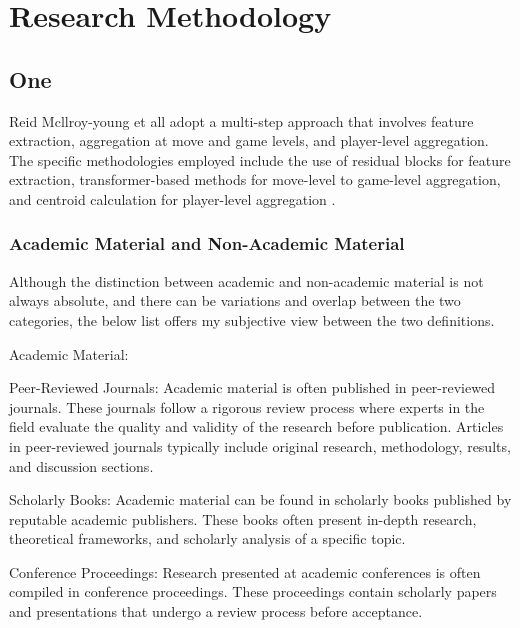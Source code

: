 
\chapter{Research Methodology}
\begin{spacing}{2.0}


\section{One}

Reid Mcllroy-young et all adopt a multi-step approach that involves feature extraction, aggregation at move and game levels, and player-level aggregation. The specific methodologies employed include the use of residual blocks for feature extraction, transformer-based methods for move-level to game-level aggregation, and centroid calculation for player-level aggregation \cite{stylometryChess}. 

\todo

\subsection{Academic Material and Non-Academic Material}

Although the distinction between academic and non-academic material is not always absolute, and there can be variations and overlap between the two categories, the below list offers my subjective view between the two definitions. 

Academic Material:

Peer-Reviewed Journals: Academic material is often published in peer-reviewed journals. These journals follow a rigorous review process where experts in the field evaluate the quality and validity of the research before publication. Articles in peer-reviewed journals typically include original research, methodology, results, and discussion sections.

Scholarly Books: Academic material can be found in scholarly books published by reputable academic publishers. These books often present in-depth research, theoretical frameworks, and scholarly analysis of a specific topic.

Conference Proceedings: Research presented at academic conferences is often compiled in conference proceedings. These proceedings contain scholarly papers and presentations that undergo a review process before acceptance.


\end{spacing}
